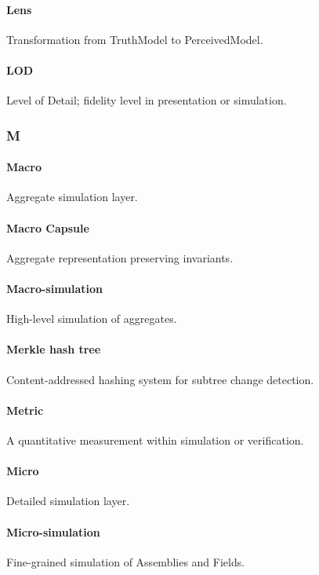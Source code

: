 \documentclass[9pt,a4paper,openany]{book}
\begin{document}
\paragraph{Lens}
Transformation from TruthModel to PerceivedModel.\allowbreak{}


\paragraph{LOD}
Level of Detail; fidelity level in presentation or simulation.\allowbreak{}


\subsubsection{M}

\paragraph{Macro}
Aggregate simulation layer.\allowbreak{}


\paragraph{Macro Capsule}
Aggregate representation preserving invariants.\allowbreak{}


\paragraph{Macro-simulation}
High-\allowbreak{}level simulation of aggregates.\allowbreak{}


\paragraph{Merkle hash tree}
Content-\allowbreak{}addressed hashing system for subtree change detection.\allowbreak{}


\paragraph{Metric}
A quantitative measurement within simulation or verification.\allowbreak{}


\paragraph{Micro}
Detailed simulation layer.\allowbreak{}


\paragraph{Micro-simulation}
Fine-\allowbreak{}grained simulation of Assemblies and Fields.\allowbreak{}
\end{document}

